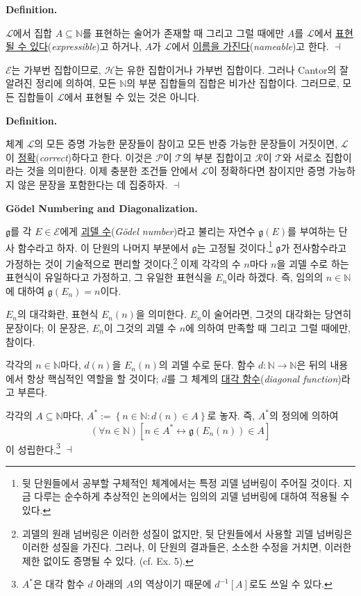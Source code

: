 \documentclass[12pt]{paper}
\newcommand{\gnum}
{ \mathfrak{g}
}
\newenvironment{context}[1][]
{ \noindent \textbf{{#1}.}
}
{ \hfill $ \dashv $
}
\begin{document}
\begin{context}[Definition]
$\mathcal{L}$에서 집합 $A \subseteq \mathbb{N}$를 표현하는 술어가 존재할 때 그리고 그럴 때에만
$A$를 $\mathcal{L}$에서 \underline{표현될 수 있다}(\textit{expressible})고 하거나,
$A$가 $\mathcal{L}$에서 \underline{이름을 가진다}(\textit{nameable})고 한다.
\end{context}

$\mathcal{E}$는 가부번 집합이므로,
$\mathcal{H}$는 유한 집합이거나 가부번 집합이다.
그러나 Cantor의 잘 알려진 정리에 의하여,
모든 $\mathbb{N}$의 부분 집합들의 집합은 비가산 집합이다.
그러므로, 모든 집합들이 $\mathcal{L}$에서 표현될 수 있는 것은 아니다.

\begin{context}[Definition]
체계 $\mathcal{L}$의 모든 증명 가능한 문장들이 참이고 모든 반증 가능한 문장들이 거짓이면,
$\mathcal{L}$이 \underline{정확}(\textit{correct})하다고 한다.
이것은 $\mathcal{P}$이 $\mathcal{T}$의 부분 집합이고 $\mathcal{R}$이 $\mathcal{T}$와 서로소 집합이라는 것을 의미한다.
이제 충분한 조건들 안에서 $\mathcal{L}$이 정확하다면 참이지만 증명 가능하지 않은 문장을 포함한다는 데 집중하자.
\end{context}

\begin{context}[G\"odel Numbering and Diagonalization]
$\gnum$를 각 $E \in \mathcal{E}$에게 \underline{괴델 수}(\textit{G\"odel number})라고 불리는 자연수 $\gnum \left( E \right)$를 부여하는 단사 함수라고 하자.
이 단원의 나머지 부분에서 $\gnum$는 고정될 것이다.\footnote
{
뒷 단원들에서 공부할 구체적인 체계에서는 특정 괴델 넘버링이 주어질 것이다.
지금 다루는 순수하게 추상적인 논의에서는 임의의 괴델 넘버링에 대하여 적용될 수 있다.
}
$\gnum$가 전사함수라고 가정하는 것이 기술적으로 편리할 것이다.\footnote
{
괴델의 원래 넘버링은 이러한 성질이 없지만,
뒷 단원들에서 사용할 괴델 넘버링은 이러한 성질을 가진다.
그러나, 이 단원의 결과들은, 소소한 수정을 거치면,
이러한 제한 없이도 증명될 수 있다.
(cf. Ex. 5).
}
이제 각각의 수 $n$마다 $n$을 괴델 수로 하는 표현식이 유일하다고 가정하고,
그 유일한 표현식을 $E_{n}$이라 하겠다.
즉, 임의의 $n \in \mathbb{N}$에 대하여 $\gnum \left( E_{n} \right) = n$이다.

$E_{n}$의 대각화란, 표현식 $E_{n} \left( n \right)$을 의미한다.
$E_{n}$이 술어라면, 그것의 대각화는 당연히 문장이다;
이 문장은, $E_{n}$이 그것의 괴델 수 $n$에 의하여 만족할 때 그리고 그럴 때에만, 참이다.

각각의 $n \in \mathbb{N}$마다, $d \left( n \right)$을 $E_{n} \left( n \right)$의 괴델 수로 둔다.
함수 $d : \mathbb{N} \to \mathbb{N}$은 뒤의 내용에서 항상 핵심적인 역할을 할 것이다;
$d$를 그 체계의 \underline{대각 함수}(\textit{diagonal function})라고 부른다.

각각의 $A \subseteq \mathbb{N}$마다, $A^{*} := \left\{ n \in \mathbb{N} : d \left( n \right) \in A \right\} $로 놓자.
즉, $A^{*}$의 정의에 의하여 $$ \left( \forall n \in \mathbb{N} \right) \left[ n \in A^{*} \leftrightarrow \gnum \left( E_{n} \left( n \right) \right) \in A \right] $$이 성립한다.\footnote
{
$A^{*}$은 대각 함수 $d$ 아래의 $A$의 역상이기 때문에 $d^{-1} \left[ A \right]$로도 쓰일 수 있다.
}
\end{context}
\end{document}
